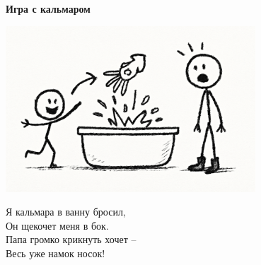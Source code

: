 \vspace*{\fill}
\begin{center}
  {\huge\textbf{Игра с кальмаром}}

  \vspace{1.5em}  \includegraphics[width=0.7\textwidth]{pictures/healthy-food.png}
  \vspace{4em}
  \parbox{0.6\textwidth}{
    \LARGE
    \begin{spacing}{1.2}
      Я кальмара в ванну бросил,\\
      Он щекочет меня в бок.\\
      Папа громко крикнуть хочет – \\
      Весь уже намок носок! %
    \end{spacing}
      
  }
\end{center}
\vspace*{\fill}